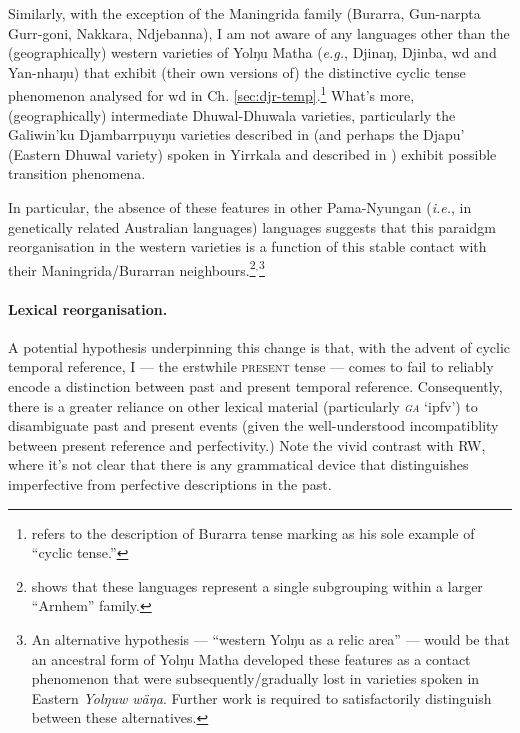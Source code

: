 Similarly, with the exception of the Maningrida family (Burarra, Gun-narpta Gurr-goni, Nakkara, Ndjebanna), I am not aware of any languages other than the (geographically) western varieties of Yolŋu Matha (\textit{e.g.}, Djinaŋ, Djinba, \gls{wd} and Yan-nhaŋu) that exhibit (their own versions of) the distinctive cyclic tense phenomenon analysed for \gls{wd} in Ch. \ref{sec:djr-temp}.\footnote{
	\citet[75]{Comrie1985} refers to the description of Burarra tense marking \citep{Glasgow1964} as his sole example of ``cyclic tense.''} What's more, (geographically) intermediate Dhuwal-Dhuwala varieties, particularly the Galiwin'ku Djambarrpuyŋu varieties described in \citet{Wilkinson1991} (and perhaps the Djapu’ (Eastern Dhuwal variety) spoken in Yirrkala and described in \citet{Morphy1983}) exhibit possible transition phenomena.

In particular, the absence of these features in other Pama-Nyungan (\textit{i.e.}, in genetically related Australian languages) languages suggests that this paraidgm reorganisation in the western varieties is a function of this stable contact with their Maningrida/Burarran neighbours.\footnote{
	\citet{Green2003} shows that these languages represent a single subgrouping within a larger ``Arnhem'' family.}$ ^, $\footnote{
	An alternative hypothesis --- ``western Yolŋu as a relic area'' --- would be that an ancestral form of Yolŋu Matha developed these features as a contact phenomenon that were subsequently/gradually lost in varieties spoken in Eastern \textit{Yolŋuw wäŋa}. Further work is required to satisfactorily distinguish between these alternatives.}



\paragraph*{Lexical reorganisation.} A potential hypothesis underpinning this change is that, with the advent of cyclic temporal reference, \gls{I} --- the erstwhile \textsc{present} tense --- comes to fail to reliably encode a distinction between past and present temporal reference. Consequently, there is a greater reliance on other lexical material (particularly \textit{\textsc{ga}} `\gls{ipfv}') to disambiguate past and present events (given the well-understood incompatiblity between present reference and perfectivity.) Note the vivid contrast with \acrlong{RW}, where it's not clear that there is any grammatical device that distinguishes imperfective from perfective descriptions in the past.

